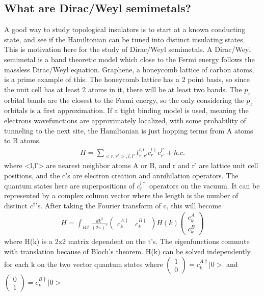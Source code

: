 \subsection{What are Dirac/Weyl semimetals?}

A good way to study topological insulators is to start at a known conducting state, and see if the Hamiltonian can be tuned into distinct insulating states. This is motivation here for the study of Dirac/Weyl semimetals. A Dirac/Weyl semimetal is a band theoretic model which close to the Fermi energy follows the massless Dirac/Weyl equation. Graphene, a honeycomb lattice of carbon atoms, is a prime example of this. The honeycomb lattice has a 2 point basis, so since the unit cell has at least 2 atoms in it, there will be at least two bands. The $p_z$ orbital bands are the closest to the Fermi energy, so the only considering the $p_z$ orbitals is a first approximation. If a tight binding model is used, meaning the electrons wavefunctions are approximately localized, with some probability of tunneling to the next site, the Hamiltonian is just hopping terms from A atoms to B atoms.
\begin{align}
H=\sum_{<r,r'>,l,l'}t^{l,l'}_{r,r'}c^{l\dag}_rc^{l'}_{r'} +h.c.
\end{align}
where <l,l'> are nearest neighbor atoms A or B, and r and r' are lattice unit cell positions, and the c's are electron creation and annihilation operators. The quantum states here are superpositions of $c^{l\dag}_r$ operators on the vacuum. It can be represented by a complex column vector where the length is the number of distinct $c^\dag$'s. After taking the Fourier transform of c, this will become 
\begin{align}
H=\int_{BZ}\frac{dk^2}{(2\pi)^2} 
\begin{pmatrix}
c^{A\dag}_k & c^{B\dag}_k
\end{pmatrix}
H(k)
\begin{pmatrix}
c^{A}_k \\
c^{B}_k
\end{pmatrix} 
\end{align}
where H(k) is a 2x2 matrix dependent on the t's. The eigenfunctions commute with translation because of Bloch's theorem. H(k) can be solved independently for each k on the two vector quantum states where $\begin{pmatrix}
	1 \\
	0
\end{pmatrix} = c^{A\dag}_k|0>$ and  $\begin{pmatrix}
0 \\
1
\end{pmatrix} = c^{B\dag}_k|0>$
